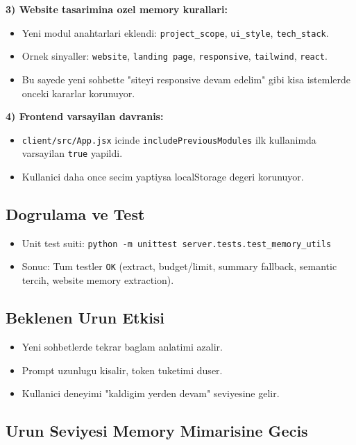 \documentclass[11pt,a4paper]{article}
\begin{document}
\textbf{3) Website tasarimina ozel memory kurallari:}
\begin{itemize}[leftmargin=1.5em]
	\item Yeni modul anahtarlari eklendi: \texttt{project\_scope}, \texttt{ui\_style}, \texttt{tech\_stack}.
	\item Ornek sinyaller: \texttt{website}, \texttt{landing page}, \texttt{responsive}, \texttt{tailwind}, \texttt{react}.
	\item Bu sayede yeni sohbette "siteyi responsive devam edelim" gibi kisa istemlerde onceki kararlar korunuyor.
\end{itemize}

\textbf{4) Frontend varsayilan davranis:}
\begin{itemize}[leftmargin=1.5em]
	\item \texttt{client/src/App.jsx} icinde \texttt{includePreviousModules} ilk kullanimda varsayilan \texttt{true} yapildi.
	\item Kullanici daha once secim yaptiysa localStorage degeri korunuyor.
\end{itemize}

\subsection{Dogrulama ve Test}

\begin{itemize}[leftmargin=1.5em]
	\item Unit test suiti: \texttt{python -m unittest server.tests.test\_memory\_utils}
	\item Sonuc: Tum testler \texttt{OK} (extract, budget/limit, summary fallback, semantic tercih, website memory extraction).
\end{itemize}

\subsection{Beklenen Urun Etkisi}

\begin{itemize}[leftmargin=1.5em]
	\item Yeni sohbetlerde tekrar baglam anlatimi azalir.
	\item Prompt uzunlugu kisalir, token tuketimi duser.
	\item Kullanici deneyimi "kaldigim yerden devam" seviyesine gelir.
\end{itemize}

\subsection{Urun Seviyesi Memory Mimarisine Gecis}
\end{document}

